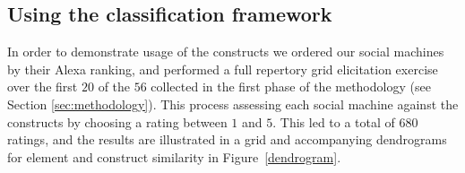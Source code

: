 \documentclass{www13-companion-accepted}
\begin{document}

\subsection{Using the classification framework}
\label{sec:usage}
In order to demonstrate usage of the constructs we ordered our social machines
by their Alexa ranking, and performed a full repertory grid elicitation exercise over the first $20$ of the $56$ collected in the first phase of the methodology (see Section \ref{sec:methodology}). This process assessing each social machine against the constructs by choosing a rating between $1$ and $5$. This led to a total of $680$ ratings, and the
results are illustrated in a grid and accompanying dendrograms for element and construct
similarity in Figure~\ref{dendrogram}.
\end{document}
